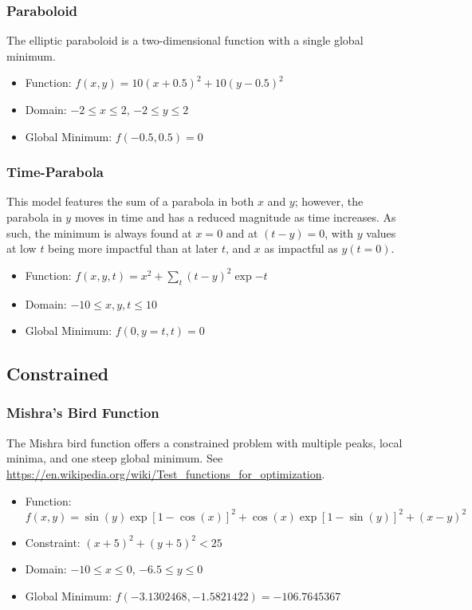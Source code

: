 \subsubsection{Paraboloid}
The elliptic paraboloid is a two-dimensional function with a single global minimum.

\begin{itemize}
  \item Function: $f(x,y) = 10(x+0.5)^2 + 10(y-0.5)^2 $
  \item Domain: $-2 \leq x \leq 2$, $-2 \leq y \leq 2$
  \item Global Minimum: $f(-0.5,0.5) = 0$
\end{itemize}

\subsubsection{Time-Parabola}
This model features the sum of a parabola in both $x$ and $y$; however, the parabola in $y$ moves in time and
has a reduced magnitude as time increases. As such, the minimum is always found at $x=0$ and at $(t-y)=0$, with
$y$ values at low $t$ being more impactful than at later $t$, and $x$ as impactful as $y(t=0)$.

\begin{itemize}
  \item Function: $f(x,y,t) = x^2 + \sum_{t} (t-y)^2 \exp{-t}$
  \item Domain: $-10 \leq x,y,t \leq 10$
  \item Global Minimum: $f(0,y=t,t) = 0$
\end{itemize}


\subsection{Constrained}
\subsubsection{Mishra's Bird Function}
The Mishra bird function offers a constrained problem with multiple peaks, local minima, and one steep global
minimum.
See \url{https://en.wikipedia.org/wiki/Test_functions_for_optimization}.

\begin{itemize}
  \item Function: $f(x,y) = \sin(y)\exp[1-\cos(x)]^2 + \cos(x)\exp[1-\sin(y)]^2 + (x-y)^2$
  \item Constraint: $(x+5)^2 + (y+5)^2 < 25$
  \item Domain: $-10 \leq x \leq 0$, $-6.5 \leq y \leq 0$
  \item Global Minimum: $f(-3.1302468, -1.5821422) = -106.7645367$
\end{itemize}

